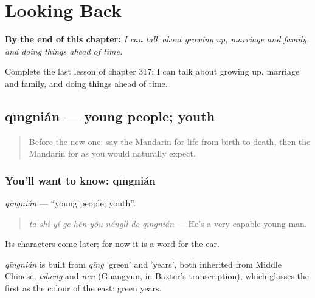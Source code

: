 
\chapter{Looking Back}
\label{ch:zh-looking-back}

\begin{chapteropening}
\textbf{By the end of this chapter:} \emph{I can talk about growing up, marriage and family, and doing things ahead of time.}

Complete the last lesson of chapter 317: I can talk about growing up, marriage and family, and doing things ahead of time.
\end{chapteropening}

\section[qīngnián]{qīngnián — young people; youth}

\label{lesson:ZH-C317-qingnian}



\begin{quote}
Before the new one: say the Mandarin for life from birth to death, then the Mandarin for as you would naturally expect.
\end{quote}

\subsection*{You'll want to know: qīngnián}
\emph{qīngnián} — \textquotedblleft{}young people; youth\textquotedblright{}.

\begin{quote}
\emph{tā shì yí ge hěn yǒu nénglì de qīngnián} — He's a very capable young man.
\end{quote}

Its characters come later; for now it is a word for the ear.

\begin{cousinweb}
\emph{qīngnián} is built from \emph{qīng} 'green' and  'years', both inherited from Middle Chinese, \emph{tsheng} and \emph{nen} (Guangyun, in Baxter's transcription), which glosses the first as the colour of the east: green years.
\end{cousinweb}

